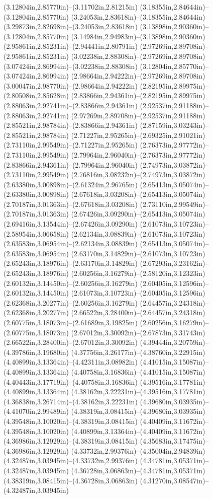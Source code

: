 (3.12804in,2.85770in)--(3.11702in,2.81215in) (3.18355in,2.84644in)--(3.12804in,2.85770in) (3.24053in,2.83618in)--(3.18355in,2.84644in) (3.29873in,2.82698in)--(3.24053in,2.83618in) (3.13898in,2.90360in)--(3.12804in,2.85770in) (3.14984in,2.94983in)--(3.13898in,2.90360in) (2.95861in,2.85231in)--(2.94441in,2.80791in) (2.97269in,2.89708in)--(2.95861in,2.85231in) (3.02238in,2.88308in)--(2.97269in,2.89708in) (3.07424in,2.86994in)--(3.02238in,2.88308in) (3.12804in,2.85770in)--(3.07424in,2.86994in) (2.98664in,2.94222in)--(2.97269in,2.89708in) (3.00047in,2.98770in)--(2.98664in,2.94222in) (2.82195in,2.89975in)--(2.80508in,2.85628in) (2.83866in,2.94361in)--(2.82195in,2.89975in) (2.88063in,2.92741in)--(2.83866in,2.94361in) (2.92537in,2.91188in)--(2.88063in,2.92741in) (2.97269in,2.89708in)--(2.92537in,2.91188in) (2.85521in,2.98784in)--(2.83866in,2.94361in) (2.87159in,3.03243in)--(2.85521in,2.98784in) (2.71227in,2.95265in)--(2.69325in,2.91021in) (2.73110in,2.99549in)--(2.71227in,2.95265in) (2.76373in,2.97772in)--(2.73110in,2.99549in) (2.79964in,2.96040in)--(2.76373in,2.97772in) (2.83866in,2.94361in)--(2.79964in,2.96040in) (2.74973in,3.03872in)--(2.73110in,2.99549in) (2.76816in,3.08232in)--(2.74973in,3.03872in) (2.63380in,3.00898in)--(2.61324in,2.96765in) (2.65413in,3.05074in)--(2.63380in,3.00898in) (2.67618in,3.03208in)--(2.65413in,3.05074in) (2.70187in,3.01363in)--(2.67618in,3.03208in) (2.73110in,2.99549in)--(2.70187in,3.01363in) (2.67426in,3.09290in)--(2.65413in,3.05074in) (2.69416in,3.13544in)--(2.67426in,3.09290in) (2.61073in,3.10723in)--(2.58954in,3.06658in) (2.62134in,3.08839in)--(2.61073in,3.10723in) (2.63583in,3.06954in)--(2.62134in,3.08839in) (2.65413in,3.05074in)--(2.63583in,3.06954in) (2.63170in,3.14829in)--(2.61073in,3.10723in) (2.65243in,3.18976in)--(2.63170in,3.14829in) (2.67293in,3.23162in)--(2.65243in,3.18976in) (2.60256in,3.16279in)--(2.58120in,3.12323in) (2.60132in,3.14450in)--(2.60256in,3.16279in) (2.60405in,3.12596in)--(2.60132in,3.14450in) (2.61073in,3.10723in)--(2.60405in,3.12596in) (2.62368in,3.20277in)--(2.60256in,3.16279in) (2.64457in,3.24318in)--(2.62368in,3.20277in) (2.66522in,3.28400in)--(2.64457in,3.24318in) (2.60775in,3.18073in)--(2.61689in,3.19825in) (2.60256in,3.16279in)--(2.60775in,3.18073in) (2.67012in,3.30092in)--(2.67873in,3.31743in) (2.66522in,3.28400in)--(2.67012in,3.30092in) (4.39444in,3.20759in)--(4.39786in,3.19680in) (4.37756in,3.26177in)--(4.38760in,3.22915in) (4.40899in,3.13364in)--(4.42311in,3.08982in) (4.41015in,3.15087in)--(4.40899in,3.13364in) (4.40758in,3.16836in)--(4.41015in,3.15087in) (4.40443in,3.17719in)--(4.40758in,3.16836in) (4.39516in,3.17781in)--(4.40899in,3.13364in) (4.38162in,3.22231in)--(4.39516in,3.17781in) (4.36838in,3.26714in)--(4.38162in,3.22231in) (4.39680in,3.03935in)--(4.41070in,2.99489in) (4.38319in,3.08415in)--(4.39680in,3.03935in) (4.39548in,3.10020in)--(4.38319in,3.08415in) (4.40409in,3.11672in)--(4.39548in,3.10020in) (4.40899in,3.13364in)--(4.40409in,3.11672in) (4.36986in,3.12929in)--(4.38319in,3.08415in) (4.35683in,3.17475in)--(4.36986in,3.12929in) (4.33732in,2.99376in)--(4.35004in,2.94839in) (4.32487in,3.03945in)--(4.33732in,2.99376in) (4.34781in,3.05371in)--(4.32487in,3.03945in) (4.36728in,3.06863in)--(4.34781in,3.05371in) (4.38319in,3.08415in)--(4.36728in,3.06863in) (4.31270in,3.08547in)--(4.32487in,3.03945in) 
